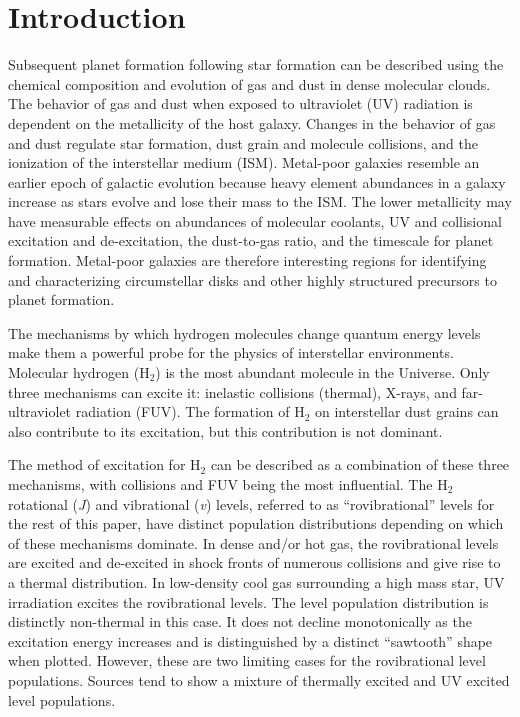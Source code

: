 \documentclass[12pt, letterpaper]{book}
\begin{document}
\chapter{Introduction}
Subsequent planet formation following star formation can be described using the chemical composition and evolution of gas and dust in dense molecular clouds. The behavior of gas and dust when exposed to ultraviolet (UV) radiation is dependent on the metallicity of the host galaxy. Changes in the behavior of gas and dust regulate star formation, dust grain and molecule collisions, and the ionization of the interstellar medium (ISM). Metal-poor galaxies resemble an earlier epoch of galactic evolution because heavy element abundances in a galaxy increase as stars evolve and lose their mass to the ISM. The lower metallicity may have measurable effects on abundances of molecular coolants, UV and collisional excitation and de-excitation, the dust-to-gas ratio, and the timescale for planet formation. Metal-poor galaxies are therefore interesting regions for identifying and characterizing circumstellar disks and other highly structured precursors to planet formation.

The mechanisms by which hydrogen molecules change quantum energy levels make them a powerful probe for the physics of interstellar environments. Molecular hydrogen ($\textrm{H}_2$) is the most abundant molecule in the Universe. Only three mechanisms can excite it: inelastic collisions (thermal), X-rays, and far-ultraviolet radiation (FUV). The formation of $\textrm{H}_2$ on interstellar dust grains can also contribute to its excitation, but this contribution is not dominant.

The method of excitation for $\textrm{H}_2$ can be described as a combination of these three mechanisms, with collisions and FUV being the most influential. The $\textrm{H}_2$ rotational ({\em J}) and vibrational ({\em v}) levels, referred to as ``rovibrational'' levels for the rest of this paper, have distinct population distributions depending on which of these mechanisms dominate. In dense and/or hot gas, the rovibrational levels are excited and de-excited in shock fronts of numerous collisions and give rise to a thermal distribution. In low-density cool gas surrounding a high mass star, UV irradiation excites the rovibrational levels. The level population distribution is distinctly non-thermal in this case. It does not decline monotonically as the excitation energy increases and is distinguished by a distinct ``sawtooth'' shape when plotted. However, these are two limiting cases for the rovibrational level populations. Sources tend to show a mixture of thermally excited and UV excited level populations.
\end{document}
